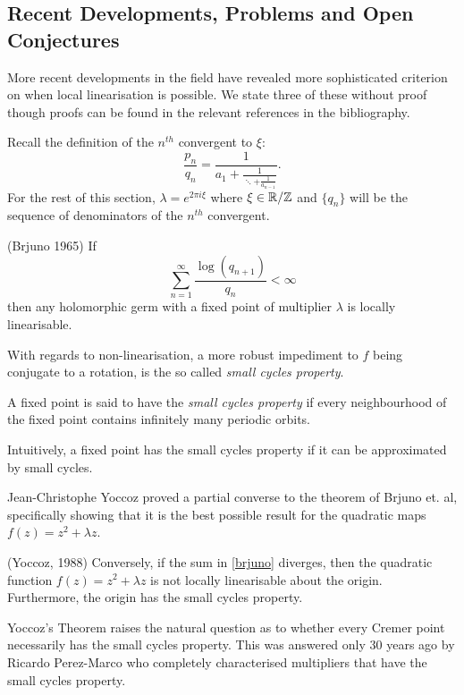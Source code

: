 \documentclass[../main.tex]{subfiles}
\begin{document}
\subsection{Recent Developments, Problems and Open Conjectures}
More recent developments in the field have revealed more sophisticated criterion on when local linearisation is possible. We state three of these without proof though proofs can be found in the relevant references in the bibliography.

Recall the definition of the $n^{th}$ convergent to $\xi$:
\[
\frac{p_n}{q_n} = \frac{1}{a_1 + \frac{1}{\ddots + \frac{1}{a_{n-1}}}}.
\]
For the rest of this section, $\lambda = e^{2\pi i \xi}$ where $\xi \in \mathbb{R}/\mathbb{Z}$ and $\{q_n\}$ will be the sequence of denominators of the $n^{th}$ convergent.

\begin{thm}(Brjuno 1965)
If
\begin{equation}\label{brjuno}
    \sum_{n = 1}^{\infty} \frac{\log{(q_{n+1})}}{q_n} < \infty
\end{equation}
then any holomorphic germ with a fixed point of multiplier $\lambda$ is locally linearisable.
\end{thm}

With regards to non-linearisation, a more robust impediment to $f$ being conjugate to a rotation, is the so called \textit{small cycles property}.

\begin{dfn} A fixed point is said to have the \textit{small cycles property} if every neighbourhood of the fixed point contains infinitely many periodic orbits.
\end{dfn}

Intuitively, a fixed point has the small cycles property if it can be approximated by small cycles.

Jean-Christophe Yoccoz proved a partial converse to the theorem of Brjuno et. al, specifically showing that it is the best possible result for the quadratic maps $f(z) = z^2 + \lambda z$.

\begin{thm}(Yoccoz, 1988)
Conversely, if the sum in \eqref{brjuno} diverges, then the quadratic function $f(z) = z^2 + \lambda z$ is not locally linearisable about the origin. Furthermore, the origin has the small cycles property.
\end{thm}

Yoccoz's Theorem raises the natural question as to whether every Cremer point necessarily has the small cycles property. This was answered only 30 years ago by Ricardo Perez-Marco who completely characterised multipliers that have the small cycles property.
\end{document}
